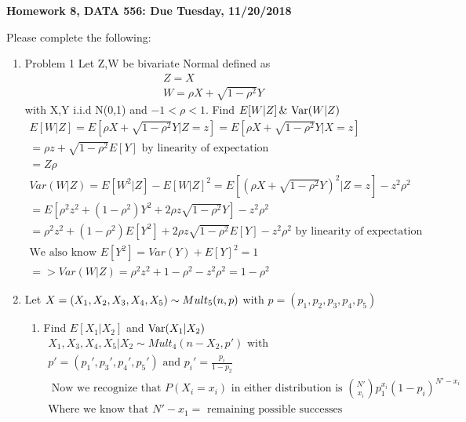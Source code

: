 \documentclass[11pt]{article}
\newcommand{\Var}{\mathop{\rm Var}}
\begin{document}
\begin{title}
	{\Large\bf Homework 8, DATA 556: Due Tuesday, 11/20/2018}
\end{title}

\author{\bf Alexander Van Roijen}

\maketitle

\newpage
Please complete the following:
\begin{enumerate}
\item Problem 1
	Let Z,W be bivariate Normal defined as
	\begin{gather}
	Z=X\\
	W=\rho X + \sqrt{1-\rho^2}Y
	\end{gather}
	with X,Y i.i.d N(0,1) and $-1<\rho<1$. Find $E[W|Z] \, \& \, \Var(W|Z)$
	\begin{gather}
	E[W|Z] = E[\rho X + \sqrt{1-\rho^2}Y|Z=z] = E[\rho X + \sqrt{1-\rho^2}Y|X=z]\\
	= \rho z + \sqrt{1-\rho^2}E[Y] \text{ by linearity of expectation}\\
	= Z\rho
	\\
	Var(W|Z) = E[W^2|Z]-E[W|Z]^2 = E[(\rho X + \sqrt{1-\rho^2}Y)^2|Z=z] - z^2 \rho^2\\ = E[\rho^2z^2 + (1-\rho^2)Y^2 + 2\rho z\sqrt{1-\rho^2}Y] - z^2\rho^2\\
	= \rho^2z^2 + (1-\rho^2)E[Y^2] + 2\rho z\sqrt{1-\rho^2}E[Y] - z^2\rho^2\text{ by linearity of expectation}\\
	\text{We also know }E[Y^2]=Var(Y)+E[Y]^2 = 1\\
	=>Var(W|Z) =  \rho^2z^2 + 1 - \rho^2 - z^2\rho^2 = 1 - \rho^2
	\end{gather}
\item Let $X = (X_1,X_2,X_3,X_4,X_5) \sim Mult_5(n,\boldmath{p})$ with $p = (p_1,p_2,p_3,p_4,p_5)$
\begin{enumerate}
	\item Find $E[X_1|X_2]$ and $\Var(X_1|X_2)$
	\begin{gather}
	X_1,X_3,X_4,X_5 | X_2 \sim Mult_4(n-X_2,p') \text{ with }\\
	p'=(p_1',p_3',p_4',p_5')\text{ and } p_i'= \frac{p_i}{1-p_2}\\
	\text{ Now we recognize that } P(X_i=x_i) \text{ in either distribution is }
	\binom{N'}{x_i}p_1^{x_i}(1-p_i)^{N'-x_i}\\
	\text{Where we know that } N'-x_1 = \text{ remaining possible successes} \\

\end{gather}
\end{enumerate}
\end{enumerate}
\end{document}
